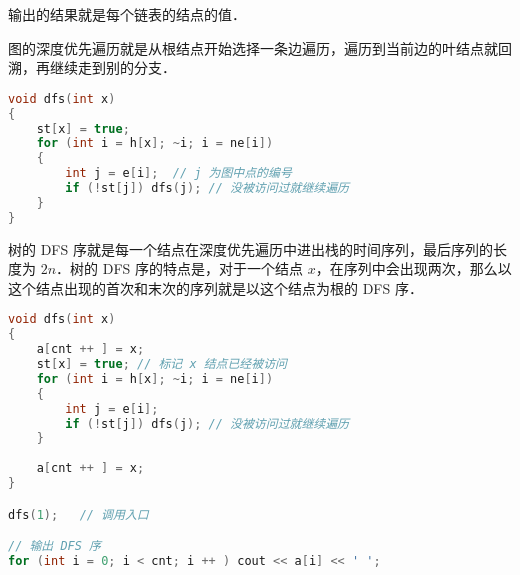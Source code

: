 输出的结果就是每个链表的结点的值．

图的深度优先遍历就是从根结点开始选择一条边遍历，遍历到当前边的叶结点就回溯，再继续走到别的分支．

\begin{lstlisting}[language=cpp]
void dfs(int x)
{
    st[x] = true;
    for (int i = h[x]; ~i; i = ne[i])
    {
        int j = e[i];  // j 为图中点的编号
        if (!st[j]) dfs(j); // 没被访问过就继续遍历
    }
}
\end{lstlisting}

树的 DFS 序就是每一个结点在深度优先遍历中进出栈的时间序列，最后序列的长度为 $2n$．树的 DFS 序的特点是，对于一个结点 $x$，在序列中会出现两次，那么以这个结点出现的首次和末次的序列就是以这个结点为根的 DFS 序．

\begin{lstlisting}[language=cpp]
void dfs(int x)
{
    a[cnt ++ ] = x;
    st[x] = true; // 标记 x 结点已经被访问
    for (int i = h[x]; ~i; i = ne[i])
    {
        int j = e[i];
        if (!st[j]) dfs(j); // 没被访问过就继续遍历
    }
    
    a[cnt ++ ] = x;
}

dfs(1);   // 调用入口

// 输出 DFS 序
for (int i = 0; i < cnt; i ++ ) cout << a[i] << ' ';
\end{lstlisting}